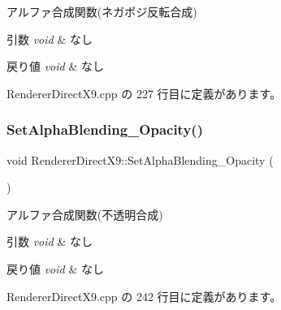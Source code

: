 アルファ合成関数(ネガポジ反転合成) 


\begin{DoxyParams}{引数}
{\em void} & なし \\
\hline
\end{DoxyParams}

\begin{DoxyRetVals}{戻り値}
{\em void} & なし \\
\hline
\end{DoxyRetVals}


 Renderer\+Direct\+X9.\+cpp の 227 行目に定義があります。

\mbox{\label{class_renderer_direct_x9_a789206ba211e9cbffe0bfe4c7dfb7457}} 
\subsubsection{\texorpdfstring{Set\+Alpha\+Blending\+\_\+\+Opacity()}{SetAlphaBlending\_Opacity()}}
{\footnotesize\ttfamily void Renderer\+Direct\+X9\+::\+Set\+Alpha\+Blending\+\_\+\+Opacity (\begin{DoxyParamCaption}{ }\end{DoxyParamCaption})}



アルファ合成関数(不透明合成) 


\begin{DoxyParams}{引数}
{\em void} & なし \\
\hline
\end{DoxyParams}

\begin{DoxyRetVals}{戻り値}
{\em void} & なし \\
\hline
\end{DoxyRetVals}


 Renderer\+Direct\+X9.\+cpp の 242 行目に定義があります。

\mbox{\label{class_renderer_direct_x9_a6ddbb9f801ef6b2c86ec5cd4e97b317b}} 
